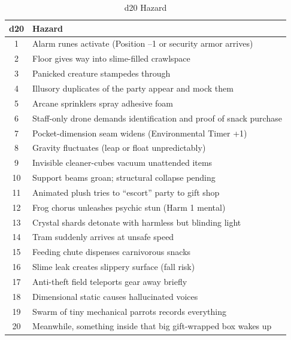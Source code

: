 \begin{table}[h]
\centering
\caption{d20 Hazard}
\label{tab:location-hazard}
\begin{tabular}{@{}cl@{}}
\toprule
d20 & Hazard \\
\midrule
1 & Alarm runes activate (Position --1 or security armor arrives) \\
2 & Floor gives way into slime-filled crawlspace \\
3 & Panicked creature stampedes through \\
4 & Illusory duplicates of the party appear and mock them \\
5 & Arcane sprinklers spray adhesive foam \\
6 & Staff-only drone demands identification and proof of snack purchase \\
7 & Pocket-dimension seam widens (Environmental Timer  +1) \\
8 & Gravity fluctuates (leap or float unpredictably) \\
9 & Invisible cleaner-cubes vacuum unattended items \\
10 & Support beams groan; structural collapse pending \\
11 & Animated plush tries to ``escort'' party to gift shop \\
12 & Frog chorus unleashes psychic stun (Harm 1 mental) \\
13 & Crystal shards detonate with harmless but blinding light \\
14 & Tram suddenly arrives at unsafe speed \\
15 & Feeding chute dispenses carnivorous snacks \\
16 & Slime leak creates slippery surface (fall risk) \\
17 & Anti-theft field teleports gear away briefly \\
18 & Dimensional static causes hallucinated voices \\
19 & Swarm of tiny mechanical parrots records everything \\
20 & Meanwhile, something inside that big gift-wrapped box wakes up \\
\bottomrule
\end{tabular}
\end{table}

